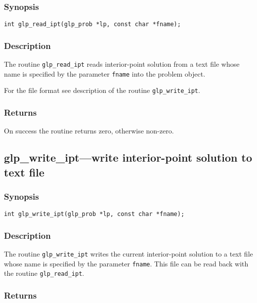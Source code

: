 \subsubsection*{Synopsis}

\begin{verbatim}
int glp_read_ipt(glp_prob *lp, const char *fname);
\end{verbatim}

\subsubsection*{Description}

The routine \verb|glp_read_ipt| reads interior-point solution from a
text file whose name is specified by the parameter \verb|fname| into the
problem object.

For the file format see description of the routine \verb|glp_write_ipt|.

\subsubsection*{Returns}

On success the routine returns zero, otherwise non-zero.

\subsection{glp\_write\_ipt---write interior-point solution to text
file}

\subsubsection*{Synopsis}

\begin{verbatim}
int glp_write_ipt(glp_prob *lp, const char *fname);
\end{verbatim}

\subsubsection*{Description}

The routine \verb|glp_write_ipt| writes the current interior-point
solution to a text file whose name is specified by the parameter
\verb|fname|. This file can be read back with the routine
\verb|glp_read_ipt|.

\subsubsection*{Returns}

